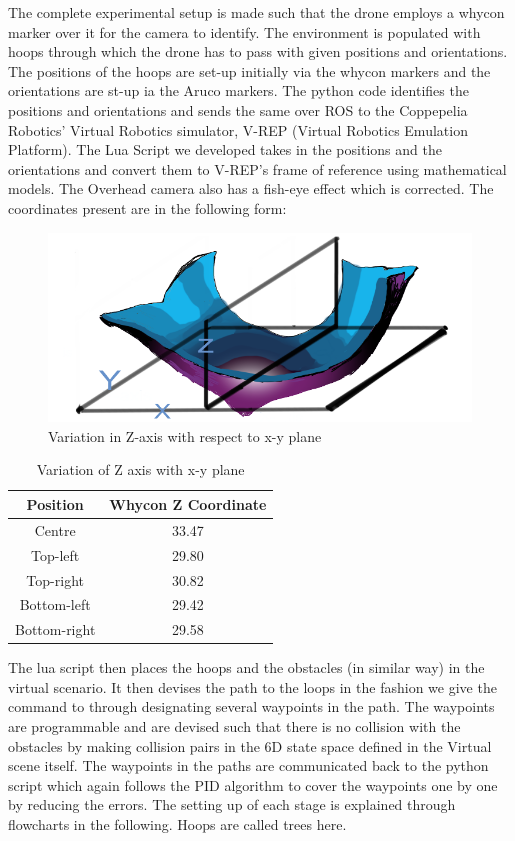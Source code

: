 The complete experimental setup is made such that the drone employs a whycon marker over it for the camera to identify. The environment is populated with hoops through which the drone has to pass with given positions and orientations. The positions of the hoops are set-up initially via the whycon markers and the orientations are st-up ia the Aruco markers. The python code identifies the positions and orientations and sends the same over ROS to the Coppepelia Robotics' Virtual Robotics simulator, V-REP (Virtual Robotics Emulation Platform). The Lua Script we developed takes in the positions and the orientations and convert them to V-REP's frame of reference using mathematical models. The Overhead camera also has a fish-eye effect which is corrected. The coordinates present are in the following form:
\begin{figure}[H]
    \centering
    \includegraphics[scale=0.6]{SummerInterReport/project/Images-Major/varz.png}
    \caption{Variation in Z-axis with respect to x-y plane}
    \label{fig:varz}
\end{figure}
\begin{table}[H]
    \centering
    \begin{tabular}{|c|c|}
     \hline
     \textbf{Position} & \textbf{Whycon Z Coordinate}  \\
     \hline
     Centre & 33.47\\
     Top-left & 29.80\\
     Top-right & 30.82\\
     Bottom-left & 29.42\\
     Bottom-right & 29.58\\
     \hline
    \end{tabular}
    \caption{Variation of Z axis with x-y plane}
    \label{tab:varz}
\end{table}

The lua script then places the hoops and the obstacles (in similar way) in the virtual scenario. It then devises the path to the loops in the fashion we give the command to through designating several waypoints in the path. The waypoints are programmable and are devised such that there is no collision with the obstacles by making collision pairs in the 6D state space defined in the Virtual scene itself. The waypoints in the paths are communicated back to the python script which again follows the PID algorithm to cover the waypoints one by one by reducing the errors. The setting up of each stage is explained through flowcharts in the following. Hoops are called trees here.

